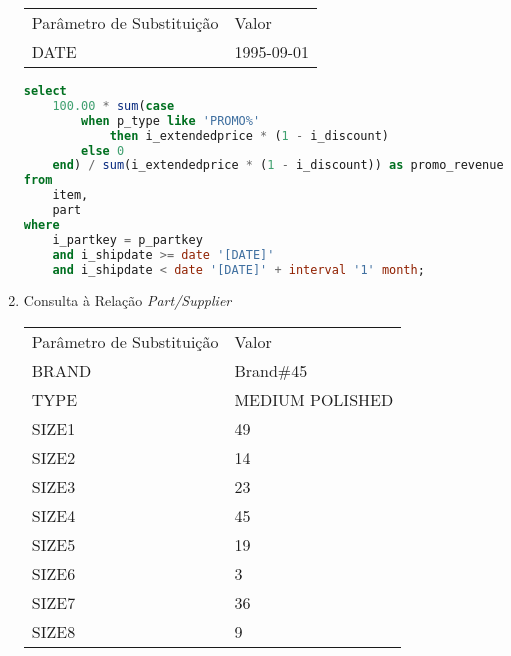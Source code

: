 \begin{enumerate}
\begin{tabular}{ll}
	Parâmetro de Substituição & Valor\\
	DATE & 1995-09-01\\
\end{tabular}

	\begin{lstlisting}[language=SQL]
select
	100.00 * sum(case
		when p_type like 'PROMO%'
			then i_extendedprice * (1 - i_discount)
		else 0
	end) / sum(i_extendedprice * (1 - i_discount)) as promo_revenue
from
	item,
	part
where
	i_partkey = p_partkey
	and i_shipdate >= date '[DATE]'
	and i_shipdate < date '[DATE]' + interval '1' month;
	\end{lstlisting}






\item Consulta à Relação \textit{Part/Supplier}

\begin{tabular}{ll}
	Parâmetro de Substituição & Valor\\
	BRAND & Brand$\#$45\\
	TYPE & MEDIUM POLISHED \\
	SIZE1 & 49 \\
	SIZE2 & 14 \\
	SIZE3 & 23 \\
	SIZE4 & 45 \\
	SIZE5 & 19 \\
	SIZE6 &  3 \\
	SIZE7 & 36 \\
	SIZE8 &  9 \\
\end{tabular}


\end{enumerate}
